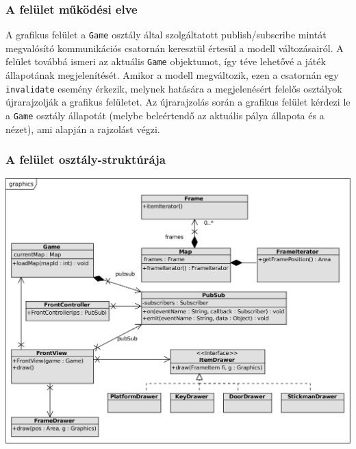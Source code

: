 		\subsubsection{A felület működési elve}
		A grafikus felület a \texttt{Game} osztály által szolgáltatott publish/subscribe mintát megvalósító kommunikációs csatornán keresztül értesül a modell változásairól. A felület továbbá ismeri az aktuális \texttt{Game} objektumot, így téve lehetővé a játék állapotának megjelenítését. Amikor a modell megváltozik, ezen a csatornán egy \texttt{invalidate} esemény érkezik, melynek hatására a megjelenésért felelős osztályok újrarajzolják a grafikus felületet. Az újrarajzolás során a grafikus felület kérdezi le a \texttt{Game} osztály állapotát (melybe beleértendő az aktuális pálya állapota és a nézet), ami alapján a rajzolást végzi.
		
		\subsubsection{A felület osztály-struktúrája}
			
	    \begin{center}
		    \includegraphics[scale=0.88]{resources/graphics.png}
	    \end{center}

